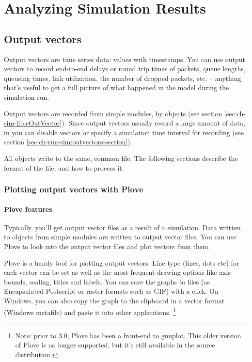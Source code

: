 \chapter{Analyzing Simulation Results}
\label{cha:analyzing-simulation-results}


\section{Output vectors}

Output vectors are time series data: values with timestamps.
You can use output vectors to record end-to-end delays or
round trip times of packets, queue lengths, queueing times,
link utilization, the number of dropped packets, etc. --
anything that's useful to get a full picture of what happened
in the model during the simulation run.

Output vectors are recorded from simple modules, by  objects
(see section \ref{sec:ch-sim-lib:cOutVector}). Since output vectors usually
record a large amount of data, in  you can disable vectors
or specify a simulation time interval for recording
(see section \ref{sec:ch-run-sim:outvectors-section}).

All  objects write to the same, common file.
The following sections describe the format of the file, and
how to process it.


\subsection{Plotting output vectors with Plove}

\subsubsection{Plove features}

Typically, you'll get output vector files as a result of a simulation.
Data written to  objects from
simple modules are written to output vector
files. You can use Plove to look
into the output vector files and plot vectors from them.

Plove is a handy tool for plotting
{\opp} output vectors. Line type (lines, dots etc) for each vector can be set
as well as the most frequent drawing options like axis bounds, scaling, titles
and labels. You can save the graphs to files (as Encapsulated Postscript or
raster formats such as GIF) with a click. On Windows, you can also
copy the graph to the clipboard in a vector format (Windows metafile)
and paste it into other applications.
    \footnote{Note: prior to {\opp} 3.0, Plove has been a front-end to
    gnuplot. This older version of Plove is no longer supported, but it's still
    available in the {\opp} source distribution.}

